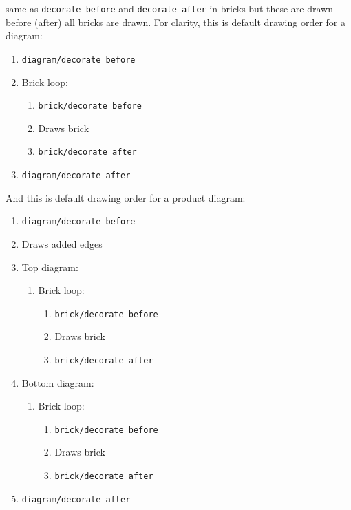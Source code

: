 \documentclass{ltxdoc}
\begin{document}
same as \texttt{decorate before} and \texttt{decorate after} in bricks but these are drawn before (after) all bricks are drawn. For clarity, this is default drawing order for a diagram:
\begin{enumerate}
    \item \texttt{diagram/decorate before}
    \item Brick loop:
    \begin{enumerate}
        \item \texttt{brick/decorate before}
        \item Draws brick
        \item \texttt{brick/decorate after}
    \end{enumerate}
    \item \texttt{diagram/decorate after}
\end{enumerate}
And this is default drawing order for a product diagram:
\begin{enumerate}
    \item \texttt{diagram/decorate before}
    \item Draws added edges
    \item Top diagram:
    \begin{enumerate}
        \item Brick loop:
        \begin{enumerate}
            \item \texttt{brick/decorate before}
            \item Draws brick
            \item \texttt{brick/decorate after}
        \end{enumerate}
    \end{enumerate}
    \item Bottom diagram:
    \begin{enumerate}
        \item Brick loop:
        \begin{enumerate}
            \item \texttt{brick/decorate before}
            \item Draws brick
            \item \texttt{brick/decorate after}
        \end{enumerate}
    \end{enumerate}
    \item \texttt{diagram/decorate after}
\end{enumerate}
\end{document}
